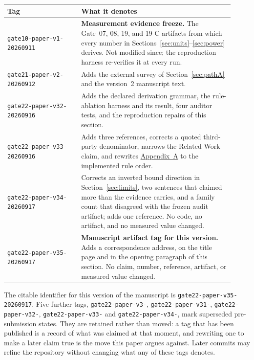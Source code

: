 \documentclass[11pt]{article}
\begin{document}
\begin{center}
\small
\begin{tabular}{@{}p{0.30\linewidth}p{0.62\linewidth}@{}}
\toprule
\textbf{Tag} & \textbf{What it denotes} \\
\midrule
\texttt{gate10-paper-v1-20260911} & \textbf{Measurement evidence freeze.} The
Gate~07, 08, 19, and 19-C artifacts from which every number in
Sections~\ref{sec:units}--\ref{sec:power} derives. Not modified since; the
reproduction harness re-verifies it at every run. \\
\texttt{gate21-paper-v2-20260912} & Adds the external survey of
Section~\ref{sec:pathA} and the version~2 manuscript text. \\
\texttt{gate22-paper-v32-20260916} & Adds the declared derivation grammar, the
rule-ablation harness and its result, four auditor tests, and the reproduction
repairs of this section. \\
\texttt{gate22-paper-v33-20260916} & Adds three references, corrects a quoted
third-party denominator, narrows the Related Work claim, and rewrites
\hyperref[app:procedure]{Appendix~A} to the implemented rule order. \\
\texttt{gate22-paper-v34-20260917} & Corrects an inverted bound direction in
Section~\ref{sec:limits}, two sentences that claimed more than the evidence
carries, and a family count that disagreed with the frozen audit artifact; adds
one reference. No code, no artifact, and no measured value changed. \\
\texttt{gate22-paper-v35-20260917} & \textbf{Manuscript artifact tag for this
version.} Adds a correspondence address, on the title page and in the opening
paragraph of this section. No claim, number, reference, artifact, or measured
value changed. \\
\bottomrule
\end{tabular}
\end{center}

\medskip
The citable identifier for this version of the manuscript is
\texttt{gate22-paper-v35-20260917}. Five further tags,
\texttt{gate22-\allowbreak paper-\allowbreak v3-},
\texttt{gate22-\allowbreak paper-\allowbreak v31-},
\texttt{gate22-\allowbreak paper-\allowbreak v32-},
\texttt{gate22-\allowbreak paper-\allowbreak v33-}
and \texttt{gate22-\allowbreak paper-\allowbreak v34-},
mark superseded pre-submission states. They are retained rather than moved: a tag that has been published is a
record of what was claimed at that moment, and rewriting one to make a later
claim true is the move this paper argues against. Later commits may refine the
repository without changing what any of these tags denotes.
\end{document}
